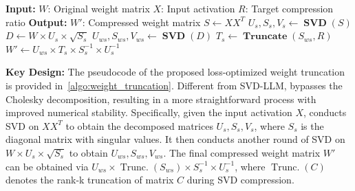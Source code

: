 \losscomparisonTable
\vspace{2mm}


\begin{algorithm}[t]
\captionsetup{font=small}
\caption{Pseudocode of Loss-optimized Weight Truncation in \sysname}
\small
\begin{algorithmic}[1] %
\Statex \textbf{Input:} $W$: Original weight matrix 
\Statex \hspace{3em} $X$: Input activation
\Statex \hspace{3em} $R$: Target compression ratio
\Statex \textbf{Output:} $W'$: Compressed weight matrix
    \State $S \gets XX^T$  
    \State $U_s, S_s, V_s \gets \boldsymbol{\operatorname{SVD}}(S)$  
    \State $D \gets W\times U_s \times \sqrt{S_s}$  
    \State $U_{ws}, S_{ws}, V_{ws} \gets \boldsymbol{\operatorname{SVD}}(D)$ 
    \State $T_s \gets \boldsymbol{\operatorname{Truncate}}(S_{ws}, R)$ 
    \State $W' \gets U_{ws}\times T_s \times S_{s} ^{-1}\times U_{s}^{-1}$ 
    \State {}
\EndProcedure
\end{algorithmic}
\label{algo:weight_truncation}
\end{algorithm}




\noindent \textbf{Key Design:}
The pseudocode of the proposed loss-optimized weight truncation is provided in~\cref{algo:weight_truncation}. Different from SVD-LLM, \sysname bypasses the Cholesky decomposition, resulting in a more straightforward process with improved numerical stability. Specifically, given the input activation $X$, \sysname conducts SVD on $XX^T$ to obtain the decomposed matrices $U_s, S_s, V_s$, where $S_s$ is the diagonal matrix with singular values. It then conducts another round of SVD on $W\times U_s\times \sqrt{S_s}$ to obtain $U_{ws}, S_{ws}, V_{ws}$. The final compressed weight matrix $W'$ can be obtained via $U_{ws}\times \boldsymbol{\operatorname{Trunc.}}(S_{ws}) \times S_{s} ^{-1}\times U_{s}^{-1} $, where $\boldsymbol{\operatorname{Trunc.}}(C)$ denotes the rank-k truncation of matrix $C$ during SVD compression.

